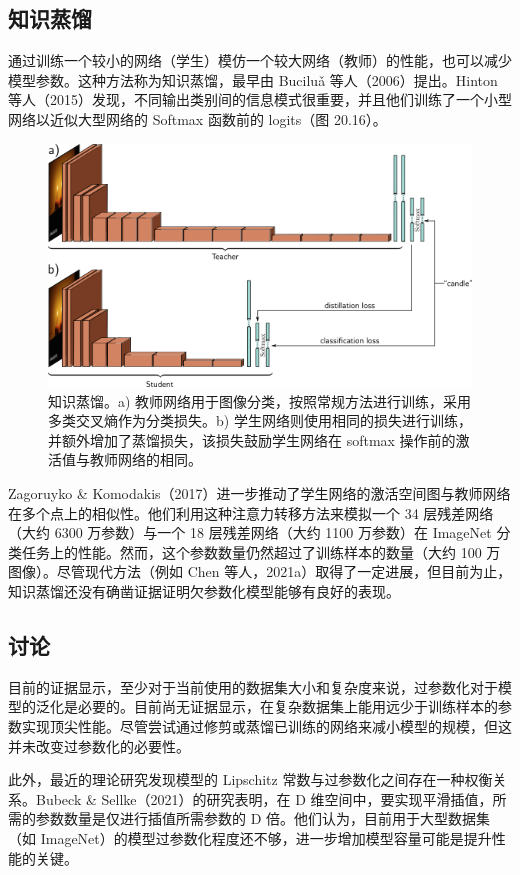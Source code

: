 \subsection{知识蒸馏}
通过训练一个较小的网络（学生）模仿一个较大网络（教师）的性能，也可以减少模型参数。这种方法称为知识蒸馏，最早由 Buciluǎ 等人（2006）提出。Hinton 等人（2015）发现，不同输出类别间的信息模式很重要，并且他们训练了一个小型网络以近似大型网络的 Softmax 函数前的 logits（图 20.16）。

\begin{figure}[ht!]
\centering
\includegraphics[width=0.7\linewidth]{png/chapter20/WhyDistill.png}
\caption{知识蒸馏。a) 教师网络用于图像分类，按照常规方法进行训练，采用多类交叉熵作为分类损失。b) 学生网络则使用相同的损失进行训练，并额外增加了蒸馏损失，该损失鼓励学生网络在 softmax 操作前的激活值与教师网络的相同。}
\end{figure}

Zagoruyko \& Komodakis（2017）进一步推动了学生网络的激活空间图与教师网络在多个点上的相似性。他们利用这种注意力转移方法来模拟一个 34 层残差网络（大约 6300 万参数）与一个 18 层残差网络（大约 1100 万参数）在 ImageNet 分类任务上的性能。然而，这个参数数量仍然超过了训练样本的数量（大约 100 万图像）。尽管现代方法（例如 Chen 等人，2021a）取得了一定进展，但目前为止，知识蒸馏还没有确凿证据证明欠参数化模型能够有良好的表现。

\subsection{讨论}
目前的证据显示，至少对于当前使用的数据集大小和复杂度来说，过参数化对于模型的泛化是必要的。目前尚无证据显示，在复杂数据集上能用远少于训练样本的参数实现顶尖性能。尽管尝试通过修剪或蒸馏已训练的网络来减小模型的规模，但这并未改变过参数化的必要性。

此外，最近的理论研究发现模型的 Lipschitz 常数与过参数化之间存在一种权衡关系。Bubeck \& Sellke（2021）的研究表明，在 D 维空间中，要实现平滑插值，所需的参数数量是仅进行插值所需参数的 D 倍。他们认为，目前用于大型数据集（如 ImageNet）的模型过参数化程度还不够，进一步增加模型容量可能是提升性能的关键。


